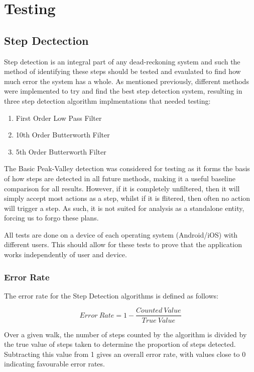 \documentclass[main.tex]{subfiles}
\begin{document}
\chapter{Testing}

\section{Step Dectection}

Step detection is an integral part of any dead-reckoning system and such the method of identifying these steps should be tested and evaulated to find how much error the system has a whole. As mentioned previously, different methods were implemented to try and find the best step detection system, resulting in three step detection algorithm implmentations that needed testing:
\begin{enumerate}
	\item First Order Low Pass Filter
	\item 10th Order Butterworth Filter
	\item 5th Order Butterworth Filter
\end{enumerate}
The Basic Peak-Valley detection was considered for testing as it forms the basis of how steps are detected in all future methods, making it a useful baseline comparison for all results. However, if it is completely unfiltered, then it will simply accept most actions as a step, whilst if it is flitered, then often no action will trigger a step. As such, it is not suited for analysis as a standalone entity, forcing us to forgo these plans.

All tests are done on a device of each operating system (Android/iOS) with different users. This should allow for these tests to prove that the application works independently of user and device.

\subsection{Error Rate}

The error rate for the Step Detection algorithms is defined as follows:

\begin{equation}
Error\ Rate = 1 - \frac{Counted\ Value}{True\ Value}
\end{equation}

Over a given walk, the number of steps counted by the algorithm is divided by the true value of steps taken to determine the proportion of steps detected. Subtracting this value from 1 gives an overall error rate, with values close to 0 indicating favourable error rates.
\end{document}
